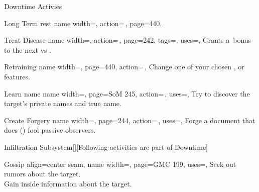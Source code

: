 \begin{PageFront}
\begin{Tables}{\frontTableHeight}
\begin{Table}{Downtime Activies}
\begin{entry}{Long Term rest}{%
                name width=\activityLength,%
                action=\,,
                page=440,
            }
            \end{entry}
            \begin{entry}{Treat Disease}{%
                name width=\activityLength,%
                action=\,,
                page=242,
                tags=\Manipulate,
                uses={\Medicine[tags=T]},
            }
                Grants a \,\Cirm bonus to the next  vs . \hfill
            \end{entry}
            \begin{entry}{Retraining}{%
                name width=\activityLength,%
                page=440,
                action=\,,
            }
                Change one of your chosen ,  or  features.\hfill
            \end{entry}
            \begin{entry}{Learn name}{%
                name width=\activityLength,%
                page=SoM 245,
                action=\,,
                uses=\Rare \Se,
            }
                Try to discover the target's private names and true name.\hfill
            \end{entry}
            \begin{entry}{Create Forgery}{%
                name width=\activityLength,%
                page=244,
                action=\,,
                uses={\Society[tags={T,S}][val=20]},
            }
                Forge a document that does {()} fool passive observers. \hfill
            \end{entry}
        \end{Table}
        \vfill
        \begin{Table}{Infiltration Subsystem}[\;\dash\;][Following activities are part of Downtime]
            \begin{entry}{Gossip}{%
                align=center seam,
                name width=\activityLength,%
                page=GMC 199,
                uses={\Diplomacy[tags=S]},
            }
                Seek out rumors about the target. \hfill
                \\
                Gain inside information about the target. \hfill

\end{entry}
\end{Table}
\end{Tables}
\end{PageFront}
